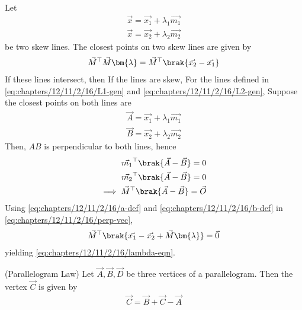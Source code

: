     Let 
    \begin{align}
        \vec{x} = \vec{x_1} + \lambda_1\vec{m_1} \label{eq:chapters/12/11/2/16/L1-gen} \\
        \vec{x} = \vec{x_2} + \lambda_2\vec{m_2} \label{eq:chapters/12/11/2/16/L2-gen}
    \end{align}
be two skew lines. 
	The closest points on two skew lines are given by 
    \begin{align}
	    \vec{M}^\top \vec{M}\bm{\lambda} = \vec{M}^\top\brak{\vec{x_2}-\vec{x_1}}
        \label{eq:chapters/12/11/2/16/lambda-eqn}
    \end{align}
	\solution
    If these lines intersect, then
    If the lines are skew,
    For the lines defined in \eqref{eq:chapters/12/11/2/16/L1-gen} and \eqref{eq:chapters/12/11/2/16/L2-gen},
Suppose the closest points on both lines are
    \begin{align}
        \vec{A} = \vec{x_1} + \lambda_1\vec{m_1} \label{eq:chapters/12/11/2/16/a-def} \\
        \vec{B} = \vec{x_2} + \lambda_2\vec{m_2}
        \label{eq:chapters/12/11/2/16/b-def}
    \end{align}
    Then, $AB$ is perpendicular to both lines, hence
    \begin{align}
        \vec{m_1}^\top\brak{\vec{A}-\vec{B}} = 0 \\
        \vec{m_2}^\top\brak{\vec{A}-\vec{B}} = 0 \\
        \implies \vec{M}^\top\brak{\vec{A}-\vec{B}} = \vec{O}
        \label{eq:chapters/12/11/2/16/perp-vec}
    \end{align}
    Using \eqref{eq:chapters/12/11/2/16/a-def} and \eqref{eq:chapters/12/11/2/16/b-def} in \eqref{eq:chapters/12/11/2/16/perp-vec},
    \begin{align}
        \vec{M}^\top\brak{\vec{x_1}-\vec{x_2} + \vec{M}\bm{\lambda}} = \vec{0} \\
    \end{align}
    yielding
        \ref{eq:chapters/12/11/2/16/lambda-eqn}.
%
\item (Parallelogram Law)  Let $\vec{A}, \vec{B}, \vec{D}$ be three vertices of a parallelogram.  Then the vertex $\vec{C}$ is given by 
\begin{align}
  \label{eq:pgm_law}
  \vec{C} = \vec{B}+\vec{C} - \vec{A}
\end{align}

